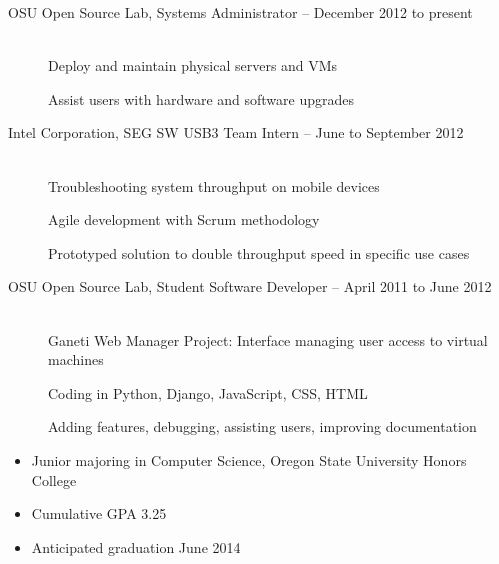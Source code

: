 \documentclass[11pt]{article}
\begin{document}
\begin{description}
\item[OSU Open Source Lab, Systems Administrator -- December 2012 to present]
    \hfill \\
    Deploy and maintain physical servers and VMs

    Assist users with hardware and software upgrades

\item[Intel Corporation, SEG SW USB3 Team Intern -- June to September
2012]
    \hfill \\
    Troubleshooting system throughput on mobile devices

    Agile development with Scrum methodology

    Prototyped solution to double throughput speed in specific use cases

\item[OSU Open Source Lab, Student Software Developer -- April 2011 to June
2012]
    \hfill \\
    Ganeti Web Manager Project: Interface managing user access to
    virtual machines

    Coding in Python, Django, JavaScript, CSS, HTML

    Adding features, debugging, assisting users, improving documentation

\end{description}

\hrulefill
\smallskip

\begin{itemize}

    \item Junior majoring in Computer Science, Oregon State University 
          Honors College

    \item Cumulative GPA 3.25

    \item Anticipated graduation June 2014

\end{itemize}
\end{document}
